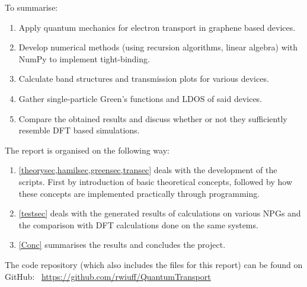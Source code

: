 To summarise:
\begin{enumerate}
	\item Apply quantum mechanics for electron transport in graphene based devices.
	\item Develop numerical methods (using recursion algorithms, linear algebra) with NumPy to implement tight-binding.
	\item Calculate band structures and transmission plots for various devices.
	\item Gather single-particle Green’s functions and LDOS of said devices.
	\item Compare the obtained results and discuss whether or not they sufficiently resemble DFT based simulations.
\end{enumerate}
The report is organised on the following way:
\begin{enumerate}
	\item \cref{theorysec,hamilsec,greensec,transec} deals with the development of the scripts. First by introduction of basic theoretical concepts, followed by how these concepts are implemented practically through programming.
	\item \cref{testsec} deals with the generated results of calculations on various NPGs and the comparison with DFT calculations done on the same systems.
	\item \cref{Conc} summarises the results and concludes the project.
\end{enumerate}
The code repository (which also includes the \latex files for this report) can be found on GitHub: \faGithub \ \url{https://github.com/rwiuff/QuantumTransport}